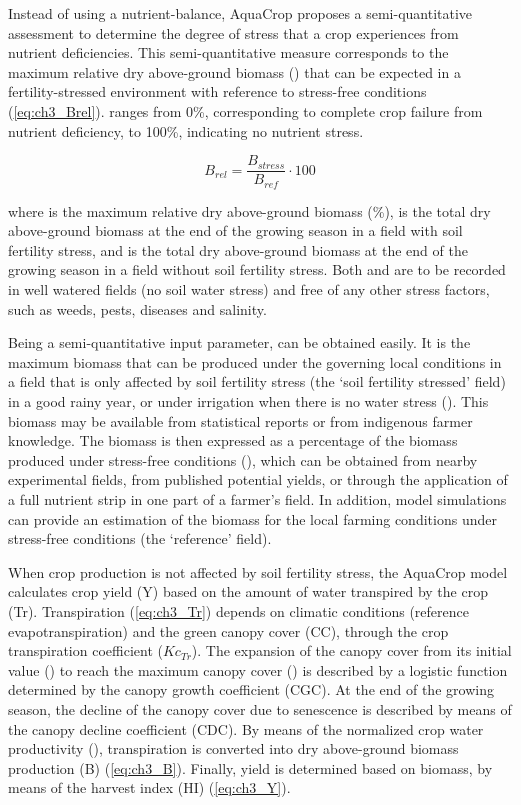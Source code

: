 Instead of using a nutrient-balance, AquaCrop proposes a semi-quantitative assessment to determine the degree of stress that a crop experiences from nutrient deficiencies. This semi-quantitative measure corresponds to the maximum relative dry above-ground biomass (\Brel) that can be expected in a fertility-stressed environment with reference to stress-free conditions (\autoref{eq:ch3_Brel}). \Brel ranges from 0\%, corresponding to complete crop failure from nutrient deficiency, to 100\%, indicating no nutrient stress.

\begin{equation}
 B_{rel}=\frac{B_{stress}}{B_{ref}}\cdot 100
 \label{eq:ch3_Brel}
\end{equation}

where \Brel is the maximum relative dry above-ground biomass (\%), \Bstress is the total dry above-ground biomass at the end of the growing season in a field with soil fertility stress, and \Bref is the total dry above-ground biomass at the end of the growing season in a field without soil fertility stress. Both \Bstress and \Bref are to be recorded in well watered fields (no soil water stress) and free of any other stress factors, such as weeds, pests, diseases and salinity.

Being a semi-quantitative input parameter, \Brel can be obtained easily. It is the maximum biomass that can be produced under the governing local conditions in a field that is only affected by soil fertility stress (the `soil fertility stressed' field) in a good rainy year, or under irrigation when there is no water stress (\Bstress). This biomass may be available from statistical reports or from indigenous farmer knowledge. The biomass is then expressed as a percentage of the biomass produced under stress-free conditions (\Bref), which can be obtained from nearby experimental fields, from published potential yields, or through the application of a full nutrient strip in one part of a farmer’s field. In addition, model simulations can provide an estimation of the biomass for the local farming conditions under stress-free conditions (the `reference' field). 

When crop production is not affected by soil fertility stress, the AquaCrop model calculates crop yield (Y) based on the amount of water transpired by the crop (Tr). Transpiration (\autoref{eq:ch3_Tr}) depends on climatic conditions (reference evapotranspiration) and the green canopy cover (CC), through the crop transpiration coefficient ($Kc_{Tr}$). The expansion of the canopy cover from its initial value (\CCo) to reach the maximum canopy cover (\CCx) is described by a logistic function determined by the canopy growth coefficient (CGC). At the end of the growing season, the decline of the canopy cover due to senescence is described by means of the canopy decline coefficient (CDC). By means of the normalized crop water productivity (\WPster), transpiration is converted into dry above-ground biomass production (B) (\autoref{eq:ch3_B}). Finally, yield is determined based on biomass, by means of the harvest index (HI) (\autoref{eq:ch3_Y}). 

